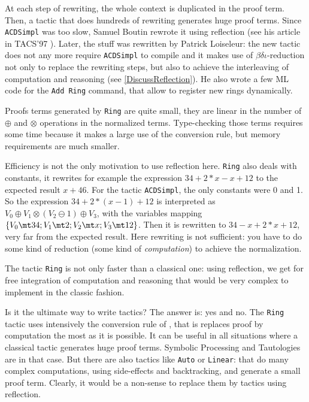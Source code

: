 At each step of rewriting, the whole context is duplicated in the proof
term. Then, a tactic that does hundreds of rewriting generates huge proof
terms. Since \texttt{ACDSimpl} was too slow, Samuel Boutin rewrote it
using reflection (see his article in TACS'97 \cite{Bou97}). Later, the
stuff was rewritten by Patrick
Loiseleur: the new tactic does not any more require \texttt{ACDSimpl}
to compile and it makes use of $\beta\delta\iota$-reduction 
not only to replace the rewriting steps, but also to achieve the
interleaving of computation and 
reasoning (see \ref{DiscussReflection}). He also wrote a
few ML code for the \texttt{Add Ring} command, that allow to register
new rings dynamically.

Proofs terms generated by \texttt{Ring} are quite small, they are
linear in the number of $\oplus$ and $\otimes$ operations in the
normalized terms. Type-checking those terms requires some time because it
makes a large use of the conversion rule, but
memory requirements are much smaller. 

\label{DiscussReflection}

Efficiency is not the only motivation to use reflection
here. \texttt{Ring} also deals with constants, it rewrites for example the
expression $34 + 2*x -x + 12$ to the expected result $x + 46$. For the
tactic \texttt{ACDSimpl}, the only constants were 0 and 1. So the
expression $34 + 2*(x - 1) + 12$ is interpreted as 
$V_0 \oplus V_1 \otimes (V_2 \ominus 1) \oplus V_3$, 
with the variables mapping 
$\{V_0 \mt 34; V_1 \mt 2; V_2 \mt x; V_3 \mt 12 \}$. Then it is
rewritten to $34 - x + 2*x + 12$, very far from the expected
result. Here rewriting is not sufficient: you have to do some kind of
reduction (some kind of \textit{computation}) to achieve the
normalization.

The tactic \texttt{Ring} is not only faster than a classical one:
using reflection, we get for free integration of computation and
reasoning that would be very complex to implement in the classic fashion.

Is it the ultimate way to write tactics? 
The answer is: yes and no. The \texttt{Ring} tactic
uses intensively the conversion
rule of \CIC, that is replaces proof by computation the most as it is
possible. It can be useful in all situations where a classical tactic
generates huge proof terms. Symbolic Processing and Tautologies are
in that case. But there are also tactics like \texttt{Auto} or
\texttt{Linear}: that do many complex computations, using side-effects
and backtracking, and generate
 a small proof term. Clearly, it would be a non-sense to
replace them by tactics using reflection.

